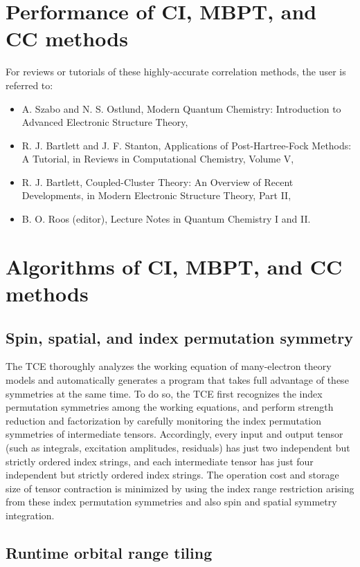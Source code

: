\section{Performance of CI, MBPT, and CC methods}

For reviews or tutorials of these highly-accurate correlation methods, the user is 
referred to:
\begin{itemize}
\item A. Szabo and N. S. Ostlund, Modern Quantum Chemistry: Introduction to Advanced Electronic Structure Theory,
\item R. J. Bartlett and J. F. Stanton, Applications of Post-Hartree-Fock Methods: A Tutorial, in Reviews in Computational Chemistry, Volume V,
\item R. J. Bartlett, Coupled-Cluster Theory: An Overview of Recent Developments, in Modern Electronic Structure Theory, Part II,
\item B. O. Roos (editor), Lecture Notes in Quantum Chemistry I and II.
\end{itemize}

\section{Algorithms of CI, MBPT, and CC methods}

\subsection{Spin, spatial, and index permutation symmetry}

The TCE thoroughly analyzes the working equation of many-electron theory models and 
automatically generates a program that takes full advantage of these symmetries at the same time.
To do so, the TCE first recognizes the index permutation symmetries among the working equations,
and perform strength reduction and factorization by carefully monitoring the index permutation
symmetries of intermediate tensors.  Accordingly, every input and output tensor (such as 
integrals, excitation amplitudes, residuals) has just two independent but strictly ordered index strings,
and each intermediate tensor has just four independent but strictly ordered index strings.
The operation cost and storage size of tensor contraction is minimized by using the index range 
restriction arising from these
index permutation symmetries and also spin and spatial symmetry integration.

\subsection{Runtime orbital range tiling}

